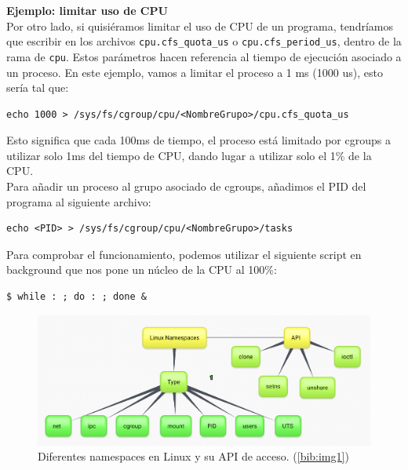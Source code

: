 \documentclass[12pt]{article}
\begin{document}
	\noindent \textbf{\large Ejemplo: limitar uso de CPU}\\
	
	\noindent Por otro lado, si quisiéramos limitar el uso de CPU de un programa, tendríamos que escribir en los archivos \texttt{cpu.cfs\_quota\_us} o \texttt{cpu.cfs\_period\_us}, dentro de la rama de \texttt{cpu}. Estos parámetros hacen referencia al tiempo de ejecución asociado a un proceso. En este ejemplo, vamos a limitar el proceso a 1 ms (1000 us), esto sería tal que:
	
	\begin{verbatim}
echo 1000 > /sys/fs/cgroup/cpu/<NombreGrupo>/cpu.cfs_quota_us
	\end{verbatim}

	\noindent Esto significa que cada 100ms de tiempo, el proceso está limitado por cgroups a utilizar solo 1ms del tiempo de CPU, dando lugar a utilizar solo el 1\% de la CPU. \\
	
	\noindent Para añadir un proceso al grupo asociado de cgroups, añadimos el PID del programa al siguiente archivo:
	
	\begin{verbatim}
echo <PID> > /sys/fs/cgroup/cpu/<NombreGrupo>/tasks
	\end{verbatim}

	\noindent Para comprobar el funcionamiento, podemos utilizar el siguiente script en background que nos pone un núcleo de la CPU al 100\%:
	\begin{verbatim}
$ while : ; do : ; done &
	\end{verbatim}
	
	
	\addvspace{60px}
	
	\begin{figure}[h!]
		\begin{center}
			\includegraphics[width=1\textwidth]{img/linux-namespace1.png}
			\caption{Diferentes namespaces en Linux y su API de acceso. (\ref{bib:img1})}
		\end{center}
	\end{figure}
	
\end{document}
